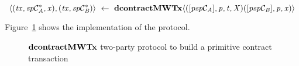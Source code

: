 \[ \langle (\mathit{tx}, \mathit{sp}\mathcal{C}_{\mathit{A}}^*, \mathit{x}), (\mathit{tx}, \mathit{sp}\mathcal{C}_{\mathit{B}}^*) \rangle ~\leftarrow~ \mathbf{dcontractMWTx} \langle([\mathit{psp}\mathcal{C}_{\mathit{A}}],\mathit{p},\mathit{t},\mathit{X}) ([\mathit{psp}\mathcal{C}_{\mathit{B}}],\mathit{p},\mathit{x}) \rangle \]

Figure~\cref{fig:d-script-tx} shows the implementation of the protocol.

\begin{figure}
    \caption{$\mathbf{dcontractMWTx}$ two-party protocol to build a primitive contract transaction} \label{fig:d-script-tx}
\end{figure}

